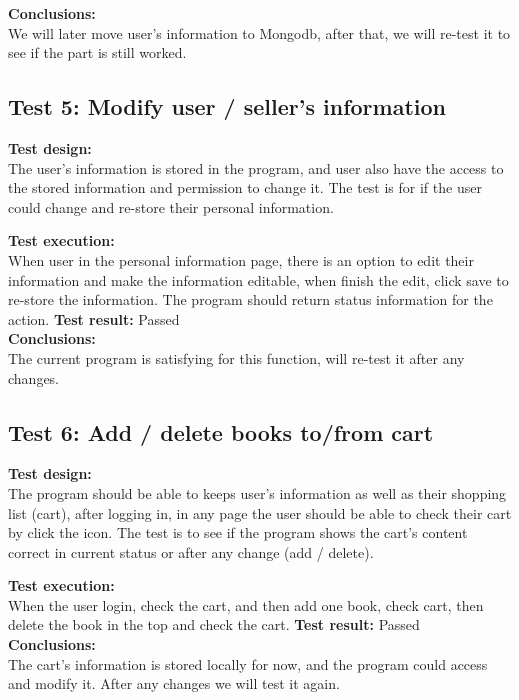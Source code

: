 \documentclass[12pt]{article}
\begin{document}
	\textbf{Conclusions:} \\

	We will later move user’s information to Mongodb, after that, we will re-test it to see if the part is still worked.


	\subsection{Test 5: Modify user / seller's information}

	\textbf{Test design:} \\
	The user’s information is stored in the program, and user also have the access to the stored information and permission to change it. The test is for if the user could change and re-store their personal information.

	\textbf{Test execution:} \\
	When user in the personal information page, there is an option to edit their information and make the information editable, when finish the edit, click save to re-store the information. The program should return status information for the action.
	\textbf{Test result: } Passed \\

	\textbf{Conclusions:} \\
	The current program is satisfying for this function, will re-test it after any changes.


	\subsection{Test 6: Add / delete books to/from cart}

	\textbf{Test design:} \\
	The program should be able to keeps user’s information as well as their shopping list (cart), after logging in, in any page the user should be able to check their cart by click the icon. The test is to see if the program shows the cart’s content correct in current status or after any change (add / delete).

	\textbf{Test execution:} \\
	When the user login, check the cart, and then add one book, check cart, then delete the book in the top and check the cart.
	\textbf{Test result: } Passed \\

	\textbf{Conclusions:} \\
	The cart’s information is stored locally for now, and the program could access and modify it. After any changes we will test it again.
\end{document}
